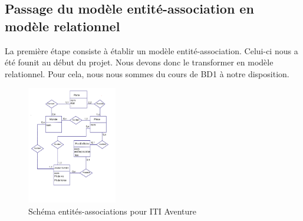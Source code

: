 \documentclass[a4paper, 12pt]{report}
\begin{document}
\subsection{Passage du modèle entité-association en modèle relationnel}

La première étape consiste à établir un modèle entité-association. Celui-ci nous a été founit au début du projet. Nous devons donc le transformer en modèle relationnel. Pour cela, nous nous sommes du cours de BD1 à notre disposition.

\begin{figure}[h]
    \centering
	\includegraphics[width=0.35\textwidth]{BD-EA.pdf}
    \caption{Schéma entités-associations pour ITI Aventure}
\end{figure}
\end{document}
